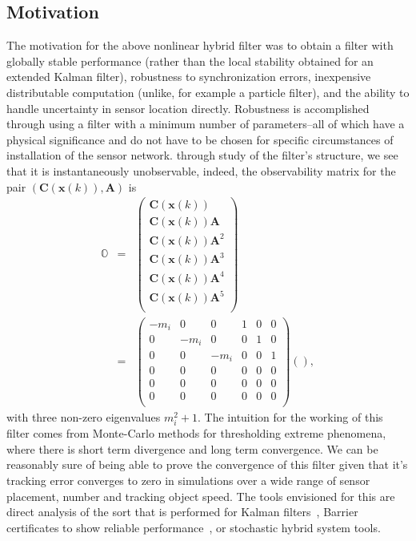 \subsection{Motivation}
The motivation for the above nonlinear hybrid filter was to obtain a filter with globally stable performance (rather than the local stability obtained for an extended Kalman filter), robustness to synchronization errors, inexpensive distributable computation (unlike, for example a particle filter), and the ability to handle uncertainty in sensor location directly. Robustness is accomplished through using a filter with a minimum number of parameters--all of which have a physical significance and do not have to be chosen for specific circumstances of installation of the sensor network. through study of the filter's structure, we see that it is instantaneously unobservable, indeed, the observability matrix for the pair $\left(\mathbf{C}\left(\mathbf{x}(k)\right),\mathbf{A}\right)$ is
\begin{eqnarray}
    \mathbb{O}&=&\left(\begin{array}{c}\mathbf{C}\left(\mathbf{x}(k)\right)\\
    \mathbf{C}\left(\mathbf{x}(k)\right)\mathbf{A}\\
    \mathbf{C}\left(\mathbf{x}(k)\right)\mathbf{A}^2\\
    \mathbf{C}\left(\mathbf{x}(k)\right)\mathbf{A}^3\\
    \mathbf{C}\left(\mathbf{x}(k)\right)\mathbf{A}^4\\ 
    \mathbf{C}\left(\mathbf{x}(k)\right)\mathbf{A}^5\\
    \end{array}\right)\label{eqn:obsvmatrix}\\
    &=&\begin{pmatrix}
         -m_i & 0 & 0 & 1 & 0 & 0 \\
         0 & -m_i & 0 & 0 & 1 & 0 \\
         0 & 0 & -m_i & 0 & 0 & 1 \\
         0 & 0 & 0 & 0 & 0 & 0 \\
         0 & 0 & 0 & 0 & 0 & 0 \\
         0 & 0 & 0 & 0 & 0 & 0 \\
       \end{pmatrix}
    \left(\right)\label{eqn:obsveig},
\end{eqnarray}
with three non-zero eigenvalues $m_i^2+1$. The intuition for the working of this filter comes from Monte-Carlo methods for thresholding extreme phenomena, where there is short term divergence and long term convergence. We can be reasonably sure of being able to prove the convergence of this filter given that it's tracking error converges to zero in simulations over a wide range of sensor placement, number and tracking object speed. The tools envisioned for this are direct analysis of the sort that is performed for Kalman filters~\cite{SOLO,BOUGEROL}, Barrier certificates to show reliable performance~\cite{PRAJ,GLA}, or stochastic hybrid system tools.
 
